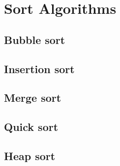 \chapter{Sort Algorithms}
	\section{Bubble sort}
	\section{Insertion sort}
	\section{Merge sort}
	\section{Quick sort}
	\section{Heap sort}
